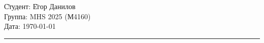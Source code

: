 \begin{tabbing}
\hspace{11cm} \= Студент: \= Егор Данилов \\
  \> Группа: MHS 2025 (М4160) \>  \\
  \> Дата: \> \today
\end{tabbing}
\hrule
\vspace{1cm}

